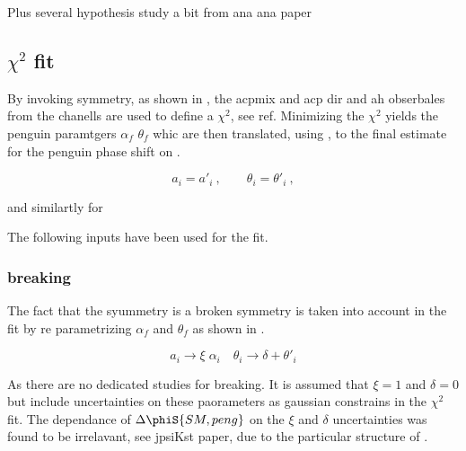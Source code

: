 Plus several hypothesis {\color{red} study a bit from ana ana paper}



\subsection{$\chi^2$ fit}
\label{penguin_chi2_fit}

By invoking \grpsuthree symmetry, as shown in , the acpmix and acp dir and ah obserbales from the chanells \BsJpsiPhi \BsJpsiRho \BsJpsiKst
are used to define a $\chi^2$, see ref. Minimizing the $\chi^2$ yields the penguin paramtgers $\alpha_f$ $\theta_f$ whic are
then translated, using , to the final estimate for the penguin phase shift on \phis.

\begin{equation}
a_i = a'_i\:,\qquad \theta_i = \theta'_i\:,
\label{su3_apply}
\end{equation}

and similartly for \BsJpsiRho

The following inputs have been used for the fit.

\subsubsection{\grpsuthree breaking}
\label{su3_breaking}

The fact that the \grpsuthree syummetry is a broken symmetry is taken into account in the fit by re parametrizing
$\alpha_f$ and $\theta_f$ as shown in .

\begin{equation}
a_i \to \xi \; \alpha_i \quad \theta_i \to \delta + \theta'_i
\label{su3_breaking}
\end{equation}

As there are no dedicated studies for \grpsuthree breaking. It is assumed that $\xi=1$ and $\delta=0$ but include uncertainties
on these paorameters as gaussian constrains in the $\chi^2$ fit. The dependance of $\Delta\phiS{SM,peng}$ on the $\xi$ and $\delta$
uncertainties was found to be irrelavant, {\color{red} see jpsiKst paper}, due to the particular structure of .
